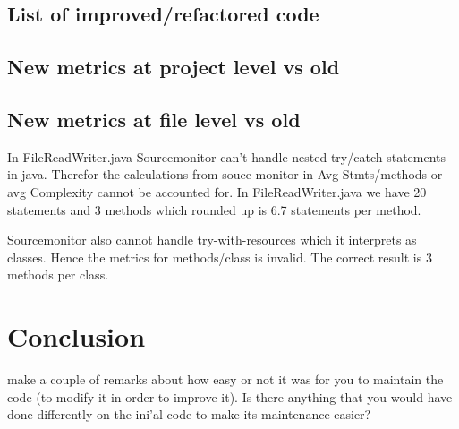 \documentclass{article}
\begin{document}
\subsection{List of improved/refactored code}

\subsection{New metrics at project level vs old}

\subsection{New metrics at file level vs old}
In FileReadWriter.java
Sourcemonitor can't handle nested try/catch statements in java. Therefor
the calculations from souce monitor in Avg Stmts/methods or 
avg Complexity cannot be accounted for. 
In FileReadWriter.java we have 20 statements and 3 methods which 
rounded up is 6.7 statements per method.

Sourcemonitor also cannot handle try-with-resources
which it interprets as classes. Hence the metrics for methods/class
is invalid. 
The correct result is 3 methods per class.

\section{Conclusion}
make a couple of remarks about how easy or not it was for you to maintain the code
(to modify it in order to improve it). Is there anything that you would have done differently on
the ini'al code to make its maintenance easier?
\end{document}
